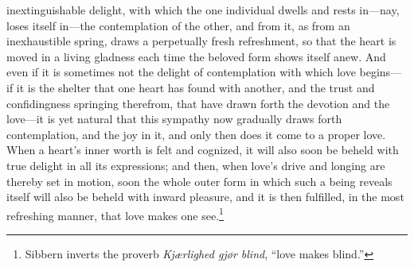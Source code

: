 \documentclass[12pt,a4paper]{book}
\begin{document}
inextinguishable delight, with which the one individual dwells and
rests in---nay, loses itself in---the contemplation of the other, and from
it, as from an inexhaustible spring, draws a perpetually fresh
refreshment, so that the heart is moved in a living gladness each time the
beloved form shows itself anew. And even if it is sometimes not the
delight of contemplation with which love begins---if it is the shelter
that one heart has found with another, and the trust and confidingness
springing therefrom, that have drawn forth the devotion and the
love---it is yet natural that this sympathy now gradually draws forth
contemplation, and the joy in it, and only then does it come to a proper
love. When a heart's inner worth is felt and cognized, it will also soon
be beheld with true delight in all its expressions; and then, when love's
drive and longing are thereby set in motion, soon the whole outer form in
which such a being reveals itself will also be beheld with inward
pleasure, and it is then fulfilled, in the most refreshing manner, that
love makes one see.\footnote{Sibbern inverts the proverb
\textit{Kjærlighed gjør blind}, ``love makes blind.''}
\end{document}
